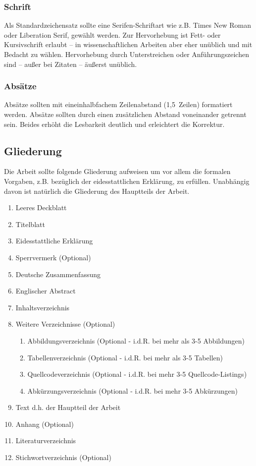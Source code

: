 \subsubsection{Schrift}\label{sec:structure:layout:fonts}
%
Als Standardzeichensatz sollte eine Serifen-Schriftart wie z.B. Times New Roman oder Liberation Serif, gewählt werden. Zur Hervorhebung ist Fett- oder Kursivschrift erlaubt – in wissenschaftlichen Arbeiten aber eher unüblich und mit Bedacht zu wählen. Hervorhebung durch Unterstreichen oder Anführungszeichen sind -- außer bei Zitaten -- äußerst unüblich.

\subsubsection{Absätze}\label{sec:structure:layout:paragraphs}
%
Absätze sollten mit eineinhalbfachem Zeilenabstand (1,5~Zeilen) formatiert werden. Absätze sollten durch einen zusätzlichen Abstand voneinander getrennt sein. Beides erhöht die Lesbarkeit deutlich und erleichtert die Korrektur.

\subsection{Gliederung}\label{sec:structure:structure}
%
Die Arbeit sollte folgende Gliederung aufweisen um vor allem die formalen Vorgaben, z.B. bezüglich der eidesstattlichen Erklärung, zu erfüllen. Unabhängig davon ist natürlich die Gliederung des Hauptteils der Arbeit.

\begin{enumerate}
  \item Leeres Deckblatt
  \item Titelblatt
  \item Eidesstattliche Erklärung
  \item Sperrvermerk (Optional)
  \item Deutsche Zusammenfassung
  \item Englischer Abstract
  \item Inhaltsverzeichnis
  \item Weitere Verzeichnisse (Optional)
  \begin{enumerate}
    \item Abbildungsverzeichnis (Optional - i.d.R. bei mehr als 3-5 Abbildungen) 
    \item Tabellenverzeichnis (Optional - i.d.R. bei mehr als 3-5 Tabellen)
    \item Quellcodeverzeichnis (Optional - i.d.R. bei mehr 3-5 Quellcode-Listings)
    \item Abkürzungsverzeichnis (Optional - i.d.R. bei mehr 3-5 Abkürzungen)
  \end{enumerate}
  \item Text d.h. der Hauptteil der Arbeit
  \item Anhang (Optional)
  \item Literaturverzeichnis 
  \item Stichwortverzeichnis (Optional)
\end{enumerate}
\smallskip

